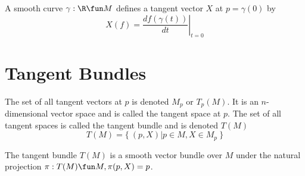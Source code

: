 \documentclass{amsart}
\begin{document}
    A smooth curve $\gamma: \R \fun M$ defines a tangent vector $X$ at $p=\gamma(0)$ by
    \begin{equation}
        X(f) = \left.\frac{df(\gamma(t))}{dt}\right|_{t=0}
    \end{equation}

    \section{Tangent Bundles}

    The set of all tangent vectors at $p$ is denoted $M_p$ or $T_p(M)$.
    It is an $n$-dimensional vector space and is called the tangent space at $p$.
    The set of all tangent spaces is called the tangent bundle and is denoted $T(M)$
    \begin{equation}
        T(M) = \{~ (p,X) | p \in M, X \in M_p ~\}
    \end{equation}

    The tangent bundle $T(M)$ is a smooth vector bundle over $M$ under the natural projection
    $\pi: T(M) \fun M, \pi(p,X) = p$.

    \printbibliography
\end{document}
